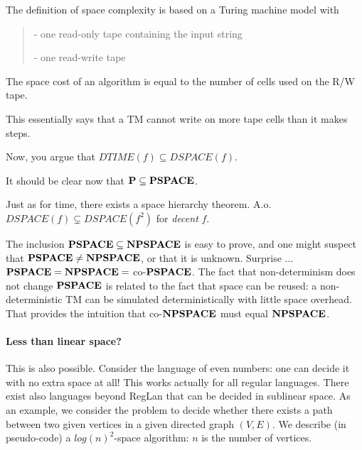The definition of space complexity is based on a Turing machine model
with
\begin{verse}
- one read-only tape containing the input string

- one read-write tape
\end{verse}
The space cost of an algorithm is equal to the number of cells used on
the R/W tape.


This essentially says that a TM cannot write on more tape cells than
it makes steps.

Now, you argue that $DTIME(f) \subseteq DSPACE(f)$. 



It should be clear now that ${\bf P} \subseteq {\bf PSPACE}$.

Just as for time, there exists a space hierarchy
theorem. A.o. $DSPACE(f) \subsetneq DSPACE(f^2)$ for {\em decent} $f$.


The inclusion ${\bf PSPACE} \subseteq {\bf NPSPACE}$ is easy to prove, and one
might suspect that ${\bf PSPACE} \neq {\bf NPSPACE}$, or that it is unknown.
Surprise ... ${\bf PSPACE} = {\bf NPSPACE} =$ co-${\bf PSPACE}$. The fact that
non-determinism does not change ${\bf PSPACE}$ is related to the fact that
space can be reused: a non-deterministic TM can be simulated
deterministically with little space overhead. That provides the
intuition that co-${\bf NPSPACE}$ must equal ${\bf NPSPACE}$.


\paragraph{Less than linear space?} This is also possible. Consider the
language of even numbers: one can decide it with no extra space at all!
This works actually for all regular languages. There exist also
languages beyond RegLan that can be decided in sublinear space. As an
example, we consider the problem to decide whether there exists a path
between two given vertices in a given directed graph $(V,E)$. We
describe (in pseudo-code) a $log(n)^2$-space algorithm: $n$ is the
number of vertices.

